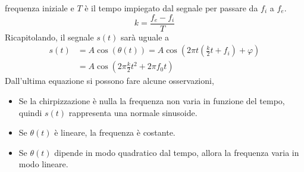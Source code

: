 frequenza iniziale e $T$ è il tempo impiegato dal segnale per passare da $f_i$ a
$f_e$.
\begin{equation}\label{equ:chirpizzazione}
        k = \frac{f_e - f_i}{T}
\end{equation}
Ricapitolando, il segnale $s(t)$ sarà uguale a 
\begin{equation}
\begin{split}
        s(t) &=A\cos(\theta(t)) 
             =A\cos\left(2\pi t\left(\frac{k}{2}t+f_i\right) +
             \varphi\right)\\
             & = A\cos\left(2\pi\frac{k}{2}t^2+2\pi f_0 t\right)
\end{split}
\end{equation}
Dall'ultima equazione si possono fare alcune osservazioni, 
\begin{itemize}
        \item Se la chirpizzazione è nulla la frequenza non varia in funzione del
        tempo, quindi $s(t)$ rappresenta una normale sinusoide.
        \item Se $\theta(t)$ è lineare, la frequenza è costante. 
        \item Se $\theta(t)$ dipende in modo quadratico dal tempo, allora la
        frequenza varia in modo lineare.
\end{itemize}

